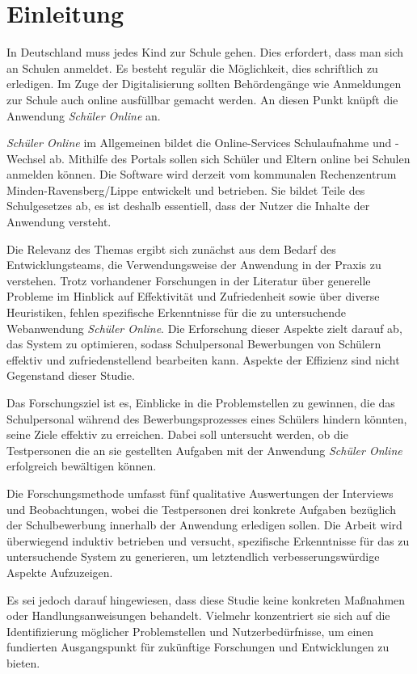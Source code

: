 \section{Einleitung}
In Deutschland muss jedes Kind zur Schule gehen. Dies erfordert, dass man sich an Schulen anmeldet. Es besteht regulär die Möglichkeit, dies schriftlich zu erledigen. Im Zuge der Digitalisierung sollten Behördengänge wie Anmeldungen zur Schule auch online ausfüllbar gemacht werden. An diesen Punkt knüpft die Anwendung \textit{Schüler Online} an.

\textit{Schüler Online} im Allgemeinen bildet die Online-Services Schulaufnahme und -Wechsel ab. Mithilfe des Portals sollen sich Schüler und Eltern online bei Schulen anmelden können. Die Software wird derzeit vom kommunalen Rechenzentrum Minden-Ravensberg/Lippe entwickelt und betrieben. Sie bildet Teile des Schulgesetzes ab, es ist deshalb essentiell, dass der Nutzer die Inhalte der Anwendung versteht. 

Die Relevanz des Themas ergibt sich zunächst aus dem Bedarf des Entwicklungsteams, die Verwendungsweise der Anwendung in der Praxis zu verstehen. Trotz vorhandener Forschungen in der Literatur über generelle Probleme im Hinblick auf Effektivität und Zufriedenheit sowie über diverse Heuristiken, fehlen spezifische Erkenntnisse für die zu untersuchende Webanwendung \textit{Schüler Online}. Die Erforschung dieser Aspekte zielt darauf ab, das System zu optimieren, sodass Schulpersonal Bewerbungen von Schülern effektiv und zufriedenstellend bearbeiten kann. Aspekte der Effizienz sind nicht Gegenstand dieser Studie.

Das Forschungsziel ist es, Einblicke in die Problemstellen zu gewinnen, die das Schulpersonal während des Bewerbungsprozesses eines Schülers hindern könnten, seine Ziele effektiv zu erreichen. Dabei soll untersucht werden, ob die Testpersonen die an sie gestellten Aufgaben mit der Anwendung \textit{Schüler Online} erfolgreich bewältigen können. 

Die Forschungsmethode umfasst fünf qualitative Auswertungen der Interviews und Beobachtungen, wobei die Testpersonen drei konkrete Aufgaben bezüglich der Schulbewerbung innerhalb der Anwendung erledigen sollen. Die Arbeit wird überwiegend induktiv betrieben und versucht, spezifische Erkenntnisse für das zu untersuchende System zu generieren, um letztendlich verbesserungswürdige Aspekte Aufzuzeigen.

Es sei jedoch darauf hingewiesen, dass diese Studie keine konkreten Maßnahmen oder Handlungsanweisungen behandelt. Vielmehr konzentriert sie sich auf die Identifizierung möglicher Problemstellen und Nutzerbedürfnisse, um einen fundierten Ausgangspunkt für zukünftige Forschungen und Entwicklungen zu bieten.

